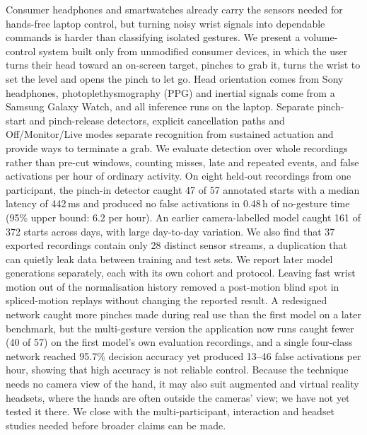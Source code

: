 \iffull
Consumer headphones and smartwatches already carry the sensors needed for hands-free laptop control, but turning noisy wrist signals into dependable commands is harder than classifying isolated gestures. We present a volume-control system built only from unmodified consumer devices, in which the user turns their head toward an on-screen target, pinches to grab it, turns the wrist to set the level and opens the pinch to let go. Head orientation comes from Sony headphones, photoplethysmography (PPG) and inertial signals come from a Samsung Galaxy Watch, and all inference runs on the laptop. Separate pinch-start and pinch-release detectors, explicit cancellation paths and Off/Monitor/Live modes separate recognition from sustained actuation and provide ways to terminate a grab. We evaluate detection over whole recordings rather than pre-cut windows, counting misses, late and repeated events, and false activations per hour of ordinary activity. On eight held-out recordings from one participant, the pinch-in detector caught 47 of 57 annotated starts with a median latency of 442\,ms and produced no false activations in 0.48\,h of no-gesture time (95\% upper bound: 6.2 per hour). An earlier camera-labelled model caught 161 of 372 starts across days, with large day-to-day variation. We also find that 37 exported recordings contain only 28 distinct sensor streams, a duplication that can quietly leak data between training and test sets. We report later model generations separately, each with its own cohort and protocol. Leaving fast wrist motion out of the normalisation history removed a post-motion blind spot in spliced-motion replays without changing the reported result. A redesigned network caught more pinches made during real use than the first model on a later benchmark, but the multi-gesture version the application now runs caught fewer (40 of 57) on the first model's own evaluation recordings, and a single four-class network reached 95.7\% decision accuracy yet produced 13--46 false activations per hour, showing that high accuracy is not reliable control. Because the technique needs no camera view of the hand, it may also suit augmented and virtual reality headsets, where the hands are often outside the cameras' view; we have not yet tested it there. We close with the multi-participant, interaction and headset studies needed before broader claims can be made.
\else
